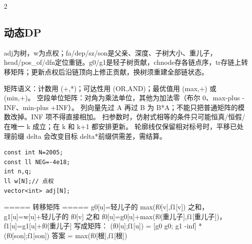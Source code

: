\documentclass[UTF8,fontset=fandol,a4paper,twoside]{ctexart}
\newcommand{\note}[1]{{\fontsize{10}{12}\selectfont #1\par}}
\begin{document}
\begin{multicols}{2}
\subsection{动态DP}

\note{adj为树，w为点权；fa/\allowbreak{}dep/\allowbreak{}sz/\allowbreak{}son是父亲、深度、子树大小、重儿子，head/\allowbreak{}pos\_of/\allowbreak{}dfn定位重链。g0/\allowbreak{}g1是轻子树贡献，chnode存各链点序，tr存链上转移矩阵；更新点权后沿链顶向上修正贡献，换树须重建全部链状态。}
\note{矩阵语义：计数用 (\allowbreak{}+\allowbreak{},\allowbreak{}*)\allowbreak{}；可达性用 (\allowbreak{}OR,\allowbreak{}AND)\allowbreak{}；最优值用 (\allowbreak{}max,\allowbreak{}+\allowbreak{})\allowbreak{} 或 (\allowbreak{}min,\allowbreak{}+\allowbreak{})\allowbreak{}。 空段单位矩阵：对角为乘法单位，其他为加法零（布尔 0、max-\allowbreak{}plus -\allowbreak{}INF、min-\allowbreak{}plus +\allowbreak{}INF）。 列向量先过 A 再过 B 为 B*A；不能只把普通矩阵的模数改掉。INF 项不得直接相加。 扫参数时，仿射式相等的条件只可能恒真/\allowbreak{}恒假/\allowbreak{}在唯一 k 成立；在 k 和 k+\allowbreak{}1 都安排更新。 轮廓线仅保留相对标号时，平移已处理前缀 delta 会改变目标 delta*前缀供需差，需结算。}
\begin{lstlisting}
const int N=2005;
const ll NEG=-4e18;
int n,q;
ll w[N];// 点权
vector<int> adj[N];
\end{lstlisting}
\note{=\allowbreak{}=\allowbreak{}=\allowbreak{}=\allowbreak{}=\allowbreak{} 转移矩阵 =\allowbreak{}=\allowbreak{}=\allowbreak{}=\allowbreak{}=\allowbreak{} g0[\allowbreak{}u]\allowbreak{}=\allowbreak{}轻儿子的 max(\allowbreak{}f0[\allowbreak{}v]\allowbreak{},\allowbreak{}f1[\allowbreak{}v]\allowbreak{})\allowbreak{} 之和，g1[\allowbreak{}u]\allowbreak{}=\allowbreak{}w[\allowbreak{}u]\allowbreak{}+\allowbreak{}轻儿子的 f0[\allowbreak{}v]\allowbreak{} 之和 f0[\allowbreak{}u]\allowbreak{}=\allowbreak{}g0[\allowbreak{}u]\allowbreak{}+\allowbreak{}max(\allowbreak{}f0[\allowbreak{}重儿子]\allowbreak{},\allowbreak{}f1[\allowbreak{}重儿子]\allowbreak{})\allowbreak{}，f1[\allowbreak{}u]\allowbreak{}=\allowbreak{}g1[\allowbreak{}u]\allowbreak{}+\allowbreak{}f0[\allowbreak{}重儿子]\allowbreak{} 写成矩阵： (\allowbreak{}f0[\allowbreak{}u]\allowbreak{};f1[\allowbreak{}u]\allowbreak{})\allowbreak{} =\allowbreak{} [\allowbreak{}g0 g0; g1 -\allowbreak{}inf]\allowbreak{} * (\allowbreak{}f0[\allowbreak{}son]\allowbreak{};f1[\allowbreak{}son]\allowbreak{})\allowbreak{} 答案 =\allowbreak{} max(\allowbreak{}f0[\allowbreak{}根]\allowbreak{},\allowbreak{}f1[\allowbreak{}根]\allowbreak{})\allowbreak{}}
\begin{lstlisting}

\end{lstlisting}
\end{multicols}
\end{document}

